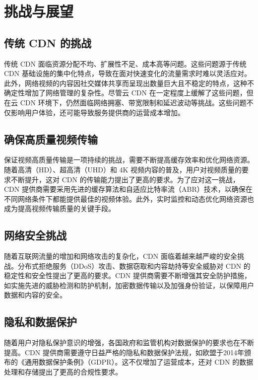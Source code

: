 \section{挑战与展望}

\subsection{传统 CDN 的挑战}

传统 CDN 面临资源分配不均、扩展性不足、成本高等问题\cite{Sun2024}。这些问题源于传统 CDN 基础设施的集中化特点，导致在面对快速变化的流量需求时难以灵活应对。此外，网络视频的内容因社交媒体共享而呈现出数量巨大且不稳定的特点，这种不确定性增加了网络管理的复杂性。尽管云 CDN 在一定程度上缓解了这些问题，但在云 CDN 环境下，仍然面临网络拥塞、带宽限制和延迟波动等挑战\cite{Sun2024}。这些问题不仅影响用户体验，还可能导致服务提供商的运营成本增加。

\subsection{确保高质量视频传输}

保证视频高质量传输是一项持续的挑战，需要不断提高缓存效率和优化网络资源\cite{ghabashnehExploringInterplayCDN2020}\cite{song2023halp}。随着高清（HD）、超高清（UHD）和 4K 视频内容的普及，用户对视频质量的要求不断提升，这对 CDN 的传输能力提出了更高的要求。为了应对这一挑战，CDN 提供商需要采用先进的缓存算法和自适应比特率流（ABR）技术，以确保在不同网络条件下都能提供最佳的视频体验。此外，实时监控和动态优化网络资源也成为提高视频传输质量的关键手段。

\subsection{网络安全挑战}

随着互联网流量的增加和网络攻击的复杂化，CDN 面临着越来越严峻的安全挑战。分布式拒绝服务（DDoS）攻击、数据窃取和内容劫持等安全威胁对 CDN 的稳定性和安全性提出了更高的要求。CDN 提供商需要不断增强其安全防护措施，如实施先进的威胁检测和防护机制，加密数据传输以及加强身份验证，以保障用户数据和内容的安全。

\subsection{隐私和数据保护}

随着用户对隐私保护意识的增强，各国政府和监管机构对数据保护的要求也在不断提高。CDN 提供商需要遵守日益严格的隐私和数据保护法规，如欧盟于2014年颁布的《通用数据保护条例》（GDPR）\cite{EURLex3222:online}。这不仅增加了运营成本，还对 CDN 的数据处理和存储提出了更高的合规性要求。

